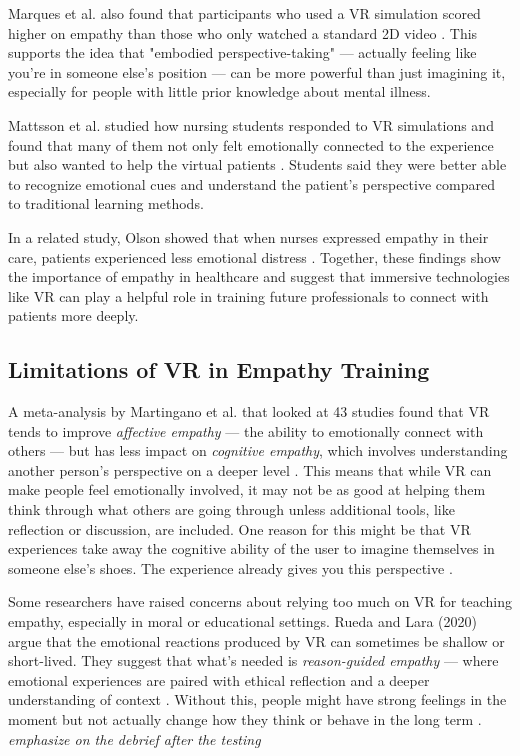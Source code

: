 Marques et al. also found that participants who used a VR simulation scored higher on empathy than those who only watched a standard 2D video \cite{Marques2022}. This supports the idea that "embodied perspective-taking" — actually feeling like you're in someone else’s position — can be more powerful than just imagining it, especially for people with little prior knowledge about mental illness.

Mattsson et al. studied how nursing students responded to VR simulations and found that many of them not only felt emotionally connected to the experience but also wanted to help the virtual patients \cite{Mattsson2024}. Students said they were better able to recognize emotional cues and understand the patient’s perspective compared to traditional learning methods.

In a related study, Olson showed that when nurses expressed empathy in their care, patients experienced less emotional distress \cite{Olson1995}. Together, these findings show the importance of empathy in healthcare and suggest that immersive technologies like VR can play a helpful role in training future professionals to connect with patients more deeply.


\subsection{Limitations of VR in Empathy Training}
A meta-analysis by Martingano et al. that looked at 43 studies found that VR tends to improve \textit{affective empathy} — the ability to emotionally connect with others — but has less impact on \textit{cognitive empathy}, which involves understanding another person’s perspective on a deeper level \cite{Martingano2021}. This means that while VR can make people feel emotionally involved, it may not be as good at helping them think through what others are going through unless additional tools, like reflection or discussion, are included. One reason for this might be that VR experiences take away the cognitive ability of the user to imagine themselves in someone else's shoes. The experience already gives you this perspective \cite{Martingano2021}. 

Some researchers have raised concerns about relying too much on VR for teaching empathy, especially in moral or educational settings. Rueda and Lara (2020) argue that the emotional reactions produced by VR can sometimes be shallow or short-lived. They suggest that what’s needed is \textit{reason-guided empathy} — where emotional experiences are paired with ethical reflection and a deeper understanding of context \cite{Rueda2020}. Without this, people might have strong feelings in the moment but not actually change how they think or behave in the long term \cite{Martingano2021}. \emph{emphasize on the debrief after the testing}

